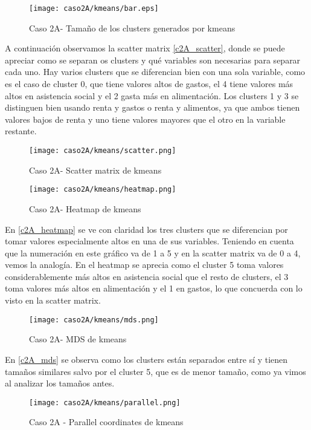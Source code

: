 \begin{figure}[H]
\caption{Caso 2A- Tamaño de los clusters generados por kmeans}
\label{c2A_tam}
\texttt{[image: caso2A/kmeans/bar.eps]}
\end{figure}

A continuación observamos la scatter matrix \eqref{c2A_scatter}, donde se puede apreciar como se separan os clusters y qué variables son necesarias para separar cada uno. Hay varios clusters que se diferencian bien con una sola variable, como es el caso de cluster 0, que tiene valores altos de gastos, el 4 tiene valores más altos en asistencia social y el 2 gasta más en alimentación. Los clusters 1 y 3 se distinguen bien usando renta y gastos o renta y alimentos, ya que ambos tienen valores bajos de renta y uno tiene valores mayores que el otro en la variable restante.

\begin{figure}[H]
\caption{Caso 2A- Scatter matrix de kmeans}
\label{c2A_scatter}
\texttt{[image: caso2A/kmeans/scatter.png]}
\end{figure}


\begin{figure}[H]
\caption{Caso 2A- Heatmap de kmeans}
\label{c2A_heatmap}
\texttt{[image: caso2A/kmeans/heatmap.png]}
\end{figure}

En \eqref{c2A_heatmap} se ve con claridad los tres clusters que se diferencian por tomar valores especialmente altos en una de sus variables. Teniendo en cuenta que la numeración en este gráfico va de 1 a 5 y en la scatter matrix va de 0 a 4, vemos la analogía. En el heatmap se aprecia como el cluster 5 toma valores considerablemente más altos en asistencia social que el resto de clusters, el 3 toma valores más altos en alimentación y el 1 en gastos, lo que concuerda con lo visto en la scatter matrix.


\begin{figure}[H]
\caption{Caso 2A- MDS de kmeans}
\label{c2A_mds}
\texttt{[image: caso2A/kmeans/mds.png]}
\end{figure}

En \eqref{c2A_mds} se observa como los clusters están separados entre sí y tienen tamaños similares salvo por el cluster 5, que es de menor tamaño, como ya vimos al analizar los tamaños antes.

\begin{figure}[H]
\caption{Caso 2A - Parallel coordinates de kmeans}
\label{c2A_parallel}
\texttt{[image: caso2A/kmeans/parallel.png]}
\end{figure}

